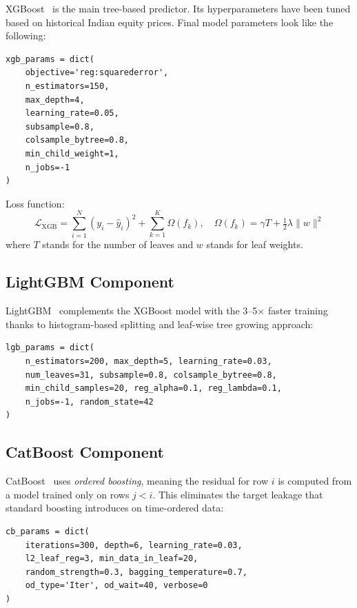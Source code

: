 \documentclass[10pt,a4paper,twoside]{article}
\begin{document}
XGBoost~\cite{chen2016} is the main tree-based predictor. Its hyperparameters have been tuned based on historical Indian equity prices. Final model parameters look like the following:

\begin{lstlisting}[caption={XGBoost configuration.}]
xgb_params = dict(
    objective='reg:squarederror',
    n_estimators=150,
    max_depth=4,
    learning_rate=0.05,
    subsample=0.8,
    colsample_bytree=0.8,
    min_child_weight=1,
    n_jobs=-1
)
\end{lstlisting}

Loss function:
\begin{equation}
  \mathcal{L}_{\text{XGB}} = \sum_{i=1}^{N}(y_i - \hat{y}_i)^2 + \sum_{k=1}^{K}\Omega(f_k),
  \quad \Omega(f_k) = \gamma T + \tfrac{1}{2}\lambda\|w\|^2
\end{equation}
where $T$ stands for the number of leaves and $w$ stands for leaf weights.

\subsection{LightGBM Component}

LightGBM~\cite{ke2017} complements the XGBoost model with the 3--5$\times$ faster training thanks to histogram-based splitting and leaf-wise tree growing approach:
\begin{lstlisting}[caption={LightGBM configuration.}]
lgb_params = dict(
    n_estimators=200, max_depth=5, learning_rate=0.03,
    num_leaves=31, subsample=0.8, colsample_bytree=0.8,
    min_child_samples=20, reg_alpha=0.1, reg_lambda=0.1,
    n_jobs=-1, random_state=42
)
\end{lstlisting}

\subsection{CatBoost Component}

CatBoost~\cite{prokhorenkova2018} uses \emph{ordered boosting}, meaning the
residual for row $i$ is computed from a model trained only on rows $j < i$.
This eliminates the target leakage that standard boosting introduces on
time-ordered data:
\begin{lstlisting}[caption={CatBoost configuration.}]
cb_params = dict(
    iterations=300, depth=6, learning_rate=0.03,
    l2_leaf_reg=3, min_data_in_leaf=20,
    random_strength=0.3, bagging_temperature=0.7,
    od_type='Iter', od_wait=40, verbose=0
)
\end{lstlisting}
\end{document}
